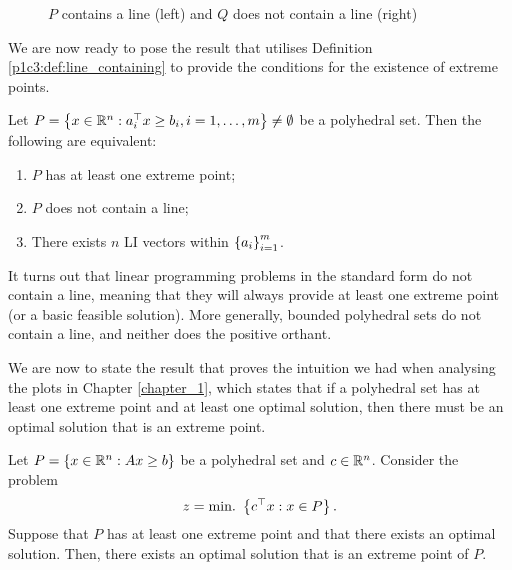 \begin{figure}[h]
	\caption{$P$ contains a line (left) and $Q$ does not contain a line (right)} \label{p1c3:fig:line_containing}	
\end{figure}

We are now ready to pose the result that utilises Definition \ref{p1c3:def:line_containing} to provide the conditions for the existence of extreme points.

\begin{theorem}\label{p1c3:thm:exist_extreme_point}
	Let $P = \left\{ x \in \mathbb{R}^n : a_i^\top x \geq b_i, i = 1, \dots, m \right \} \neq \emptyset$ be a polyhedral set. Then the following are equivalent:
	\begin{enumerate}
		\item $P$ has at least one extreme point;
		\item $P$ does not contain a line;
		\item There exists $n$ LI vectors within $\left\{ a_i \right \}_{i=1}^m$.	
	\end{enumerate}	
\end{theorem}	 


It turns out that linear programming problems in the standard form do not contain a line, meaning that they will always provide at least one extreme point (or a basic feasible solution). More generally, bounded polyhedral sets do not contain a line, and neither does the positive orthant.

We are now to state the result that proves the intuition we had when analysing the plots in Chapter \ref{chapter_1}, which states that if a polyhedral set has at least one extreme point and at least one optimal solution, then there must be an optimal solution that is an extreme point.

\begin{theorem}\label{p1c3:thm:opt_extreme}
		Let $P = \left\{ x \in \mathbb{R}^n : Ax \geq b \right \}$ be a polyhedral set and $c \in \mathbb{R}^n$. Consider the problem 
			\begin{equation*}
		    		z = \mathop{\text{min.~}}\left\{ c^\top x : x \in P \right \}.					
			\end{equation*}
		Suppose that $P$ has at least one extreme point and that there exists an optimal solution. Then, there exists an optimal solution that is an extreme point of $P$.
\end{theorem}

